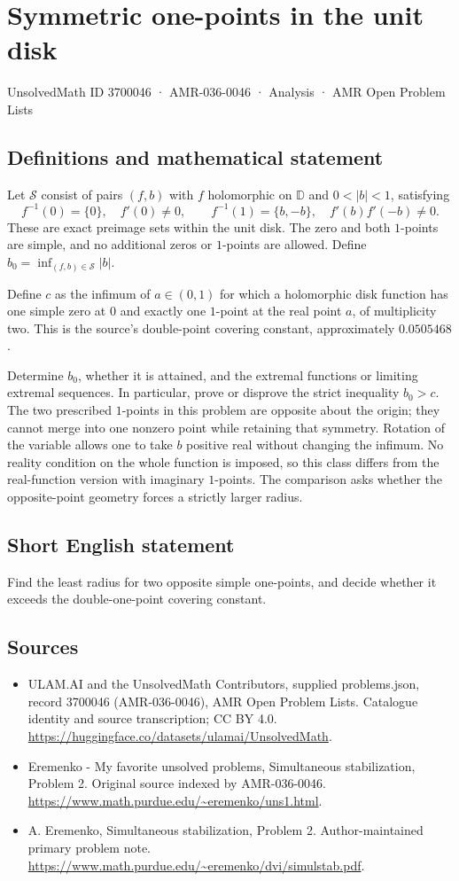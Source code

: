 \documentclass[11pt,a4paper]{article}
\begin{document}
\section*{Symmetric one-points in the unit disk}\label{3700046}
{\small UnsolvedMath ID 3700046 · AMR-036-0046 · Analysis · AMR Open Problem Lists}
\subsection{Definitions and mathematical statement}
Let $\mathcal S$ consist of pairs $(f,b)$
with $f$ holomorphic on $\mathbb D$ and
$0<|b|<1$, satisfying
\[
 f^{-1}(0)=\{0\},\quad f'(0)\ne0,\qquad
 f^{-1}(1)=\{b,-b\},\quad f'(b)f'(-b)\ne0.
\]
These are exact preimage sets within the
unit disk. The zero and both $1$-points
are simple, and no additional zeros or
$1$-points are allowed. Define
$b_0=\inf_{(f,b)\in\mathcal S}|b|$.

Define $c$ as the infimum of $a\in(0,1)$
for which a holomorphic disk function has
one simple zero at $0$ and exactly one
$1$-point at the real point $a$, of
multiplicity two. This is the source's
double-point covering constant, approximately
$0.0505468$.

Determine $b_0$, whether it is attained,
and the extremal functions or limiting
extremal sequences. In particular, prove
or disprove the strict inequality $b_0>c$.
The two prescribed $1$-points in this
problem are opposite about the origin;
they cannot merge into one nonzero point
while retaining that symmetry.
Rotation of the variable allows one to
take $b$ positive real without changing
the infimum. No reality condition on the
whole function is imposed, so this class
differs from the real-function version
with imaginary $1$-points. The comparison
asks whether the opposite-point geometry
forces a strictly larger radius.
\subsection{Short English statement}
Find the least radius for two opposite simple one-points, and decide whether it exceeds the double-one-point covering constant.
\subsection{Sources}
\begin{itemize}
\item[S1] ULAM.AI and the UnsolvedMath Contributors, supplied problems.json, record 3700046 (AMR-036-0046), AMR Open Problem Lists. Catalogue identity and source transcription; CC BY 4.0.
\url{https://huggingface.co/datasets/ulamai/UnsolvedMath}.
\item[S2] Eremenko - My favorite unsolved problems, Simultaneous stabilization, Problem 2. Original source indexed by AMR-036-0046.
\url{https://www.math.purdue.edu/~eremenko/uns1.html}.
\item[S3] A. Eremenko, Simultaneous stabilization, Problem 2. Author-maintained primary problem note.
\url{https://www.math.purdue.edu/~eremenko/dvi/simulstab.pdf}.
\end{itemize}
\end{document}
